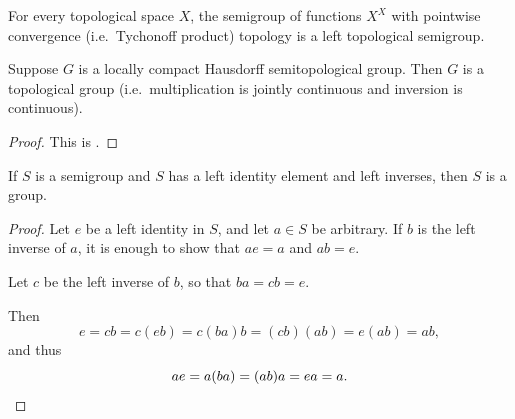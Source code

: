 	\begin{ex}
		For every topological space $X$, the semigroup of functions $X^X$ with pointwise convergence (i.e.\ Tychonoff product) topology is a left topological semigroup.
		\xqed{\lozenge}
	\end{ex}
	
	\begin{fct}
		\label{fct:ellis_joint_cont}
		Suppose $G$ is a locally compact Hausdorff semitopological group. Then $G$ is a topological group (i.e.\ multiplication is jointly continuous and inversion is continuous).
	\end{fct}
	\begin{proof}
		This is \cite[Theorem 2]{ellis57}.
	\end{proof}
	
	\begin{fct}
		\label{fct:elementary_algebra}
		If $S$ is a semigroup and $S$ has a left identity element and left inverses, then $S$ is a group.
	\end{fct}
	\begin{proof}
		Let $e$ be a left identity in $S$, and let $a\in S$ be arbitrary. If $b$ is the left inverse of $a$, it is enough to show that $ae=a$ and $ab=e$.
		
		Let $c$ be the left inverse of $b$, so that $ba=cb=e$.
		
		Then
		\[
			e=cb=c(eb)=c(ba)b=(cb)(ab)=e(ab)=ab,
		\]
		and thus
		\[
			ae=a(ba)=(ab)a=ea=a.\qedhere
		\]
	\end{proof}
	
